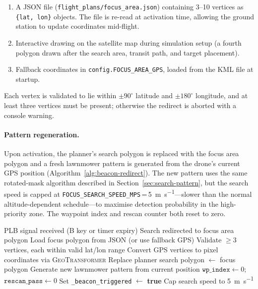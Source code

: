 \begin{enumerate}
  \item A JSON file (\texttt{flight\_plans/focus\_area.json}) containing 3--10 vertices as \texttt{\{lat, lon\}} objects. The file is re-read at activation time, allowing the ground station to update coordinates mid-flight.
  \item Interactive drawing on the satellite map during simulation setup (a fourth polygon drawn after the search area, transit path, and target placement).
  \item Fallback coordinates in \texttt{config.FOCUS\_AREA\_GPS}, loaded from the KML file at startup.
\end{enumerate}

\noindent Each vertex is validated to lie within $\pm90^{\circ}$ latitude and $\pm180^{\circ}$ longitude, and at least three vertices must be present; otherwise the redirect is aborted with a console warning.

\paragraph{Pattern regeneration.}
Upon activation, the planner's search polygon is replaced with the focus area polygon and a fresh lawnmower pattern is generated from the drone's current GPS position (Algorithm~\ref{alg:beacon-redirect}). The new pattern uses the same rotated-mask algorithm described in Section~\ref{sec:search-pattern}, but the search speed is capped at \texttt{FOCUS\_SEARCH\_SPEED\_MPS}\,=\,\SI{5}{\metre\per\second}---slower than the normal altitude-dependent schedule---to maximise detection probability in the high-priority zone. The waypoint index and rescan counter both reset to zero.

\begin{algorithm}[ht]
\caption{PLB beacon redirect}\label{alg:beacon-redirect}
\begin{algorithmic}[1]
\Require PLB signal received (B key or timer expiry)
\Ensure Search redirected to focus area polygon
 \Return \EndIf
\State Load focus polygon from JSON (or use fallback GPS)
\State Validate $\geq 3$ vertices, each within valid lat/lon range
\State Convert GPS vertices to pixel coordinates via \textsc{GeoTransformer}
\State Replace planner search polygon $\gets$ focus polygon
\State Generate new lawnmower pattern from current position
\State $\texttt{wp\_index} \gets 0$; $\texttt{rescan\_pass} \gets 0$
\State Set \texttt{\_beacon\_triggered} $\gets$ \textbf{true}
\State Cap search speed to \SI{5}{\metre\per\second}
\end{algorithmic}
\end{algorithm}

